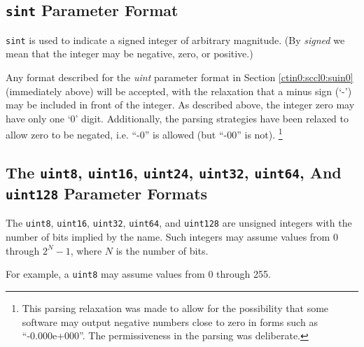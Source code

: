 \subsection{\texttt{sint} Parameter Format}
\label{ctin0:sccl0:ssin0}

\texttt{sint} is used to indicate a signed integer 
of arbitrary magnitude.  (By \emph{signed} we mean
that the integer may be negative, zero, or positive.)

Any format described for the \emph{uint} parameter format
in Section \ref{ctin0:sccl0:suin0} (immediately above)
will be accepted, with the relaxation that a minus sign
(`-') may be included in front of the integer.  As described
above, the integer zero may have only one `0' digit.
Additionally, the parsing strategies have been relaxed to
allow zero to be negated, i.e. ``-0'' is allowed (but 
``-00'' is not).  \footnote{This parsing relaxation was made to allow for the
possibility that some software may output negative numbers
close to zero in forms such as ``-0.000e+000''.  The
permissiveness in the parsing was deliberate.}


\subsection{The \texttt{uint8}, \texttt{uint16},
            \texttt{uint24}, 
            \texttt{uint32}, \texttt{uint64}, And
            \texttt{uint128} Parameter Formats}
\label{ctin0:sccl0:suig0}

The \texttt{uint8}, \texttt{uint16},
\texttt{uint32}, \texttt{uint64}, and
\texttt{uint128} are unsigned integers with the 
number of bits implied by the name.  Such integers
may assume values from 0 through $2^{N} - 1$,
where $N$ is the number of bits.

For example, a \texttt{uint8} may assume values from
0 through 255.


